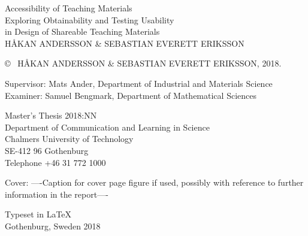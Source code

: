 \newpage
\thispagestyle{plain}
\vspace*{4.5cm}
Accessibility of Teaching Materials\\
Exploring Obtainability and Testing Usability \\[0.1cm] in Design of Shareable Teaching Materials\\
HÅKAN ANDERSSON \& SEBASTIAN EVERETT ERIKSSON  \setlength{\parskip}{1cm}

\copyright ~ HÅKAN ANDERSSON \& SEBASTIAN EVERETT ERIKSSON, 2018. \setlength{\parskip}{1cm}

Supervisor: Mats Ander, Department of Industrial and Materials Science\\
Examiner: Samuel Bengmark, Department of Mathematical Sciences \setlength{\parskip}{1cm}

Master's Thesis 2018:NN\\	%
Department of Communication and Learning in Science\\
Chalmers University of Technology\\
SE-412 96 Gothenburg\\
Telephone +46 31 772 1000 \setlength{\parskip}{0.5cm}

\vfill
Cover: ----Caption for cover page figure if used, possibly with reference to further information in the report---- \setlength{\parskip}{0.5cm}

Typeset in \LaTeX \\
Gothenburg, Sweden 2018

